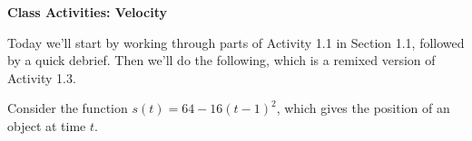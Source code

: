 \documentclass[11pt]{article}
\begin{document}
	
	\thispagestyle{empty}
	\renewcommand{\headrulewidth}{0.0pt}
	\thispagestyle{fancy}
	\lfoot{}
	\cfoot{}
	\rfoot{}	
	
	\vspace*{0in}

		\begin{center}
			\begin{large}
			\textbf{Class Activities: Velocity} \\
			\end{large}
		\end{center}
	
	

Today we'll start by working through parts of Activity 1.1 in Section 1.1, followed by a quick debrief. Then we'll do the following, which is a remixed version of Activity 1.3. 

\bigskip

Consider the function $s(t) = 64 - 16(t-1)^2$, which gives the position of an object at time $t$. 
\end{document}
